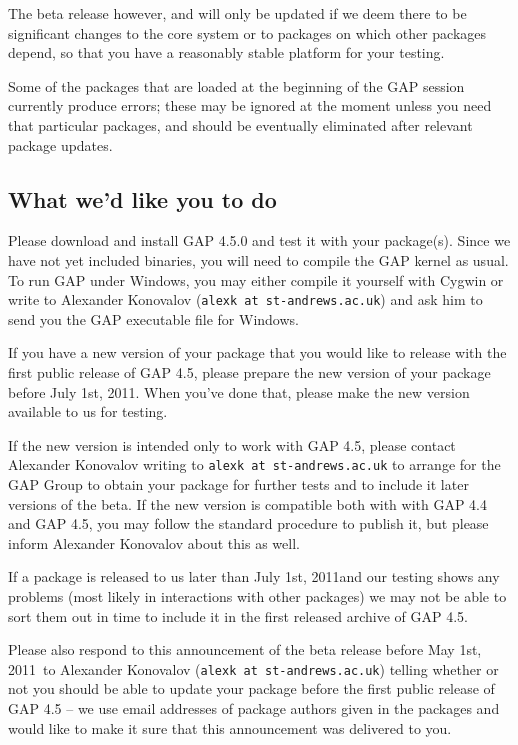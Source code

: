 \documentclass[10pt]{article}
\def\replydate{May 1st, 2011}
\def\pkgdeadline{July 1st, 2011}
\begin{document}
The beta release however, and will only be updated 
if we deem there to be significant changes to the core system or to packages on which 
other packages depend, so that you have a reasonably stable platform for your testing. 

Some of the packages that are loaded at the beginning of the GAP session 
currently produce errors; these may be ignored at the moment unless you 
need that particular packages, and should be eventually eliminated after 
relevant package updates.



\subsection*{What we'd like you to do}



Please download and install GAP 4.5.0 and test it with your package(s). 
Since we have not yet included binaries, you will need to compile the GAP kernel as usual. To run GAP under
Windows, you may either compile it yourself with Cygwin or write to Alexander 
Konovalov (\verb|alexk at st-andrews.ac.uk|) and ask him to send you the  GAP 
executable file for Windows.


If you have a new version of your package that you would like to  release with the first
public release of GAP 4.5, please prepare the new version of your package 
before \pkgdeadline. When you've done that, please make the new version available to us for testing.

If the new version is intended only to work with GAP 4.5, please 
contact Alexander Konovalov writing to \verb|alexk at st-andrews.ac.uk|
to arrange for the GAP Group to obtain your package for further tests and to include it later versions of the beta. If the
new version is compatible both with with GAP 4.4 and GAP 4.5, you
may follow the standard procedure to publish it, but please
inform Alexander Konovalov about this as well.

If a package is released to us later than \pkgdeadline and our testing shows any problems 
(most likely in interactions with other packages) we may not be able to 
sort them out in time to include it in the first released archive of GAP 4.5. 

Please also respond to this announcement of the beta release before \replydate \,
to Alexander Konovalov (\verb|alexk at st-andrews.ac.uk|) 
telling whether or not you should be able to update your package before the 
first public release of GAP 4.5 -- we use email addresses of package authors 
given in the packages and would like to make it sure that this announcement
was delivered to you.
\end{document}
